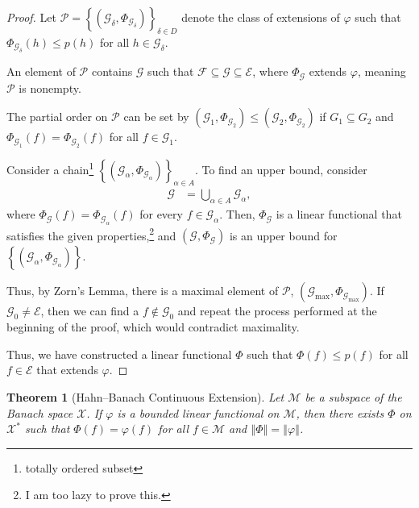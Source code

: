 \documentclass[12pt]{extarticle}
\newcommand{\norm}[1]{\left\Vert #1\right\Vert}
\newcommand{\set}[1]{\left\{#1\right\}}
\theoremstyle{plain}
\newtheorem*{theorem}{Theorem}
\theoremstyle{definition}
\theoremstyle{note}
\renewcommand{\newline}{\hfill\break}
\begin{document}
\begin{proof}
  Let $\mathcal{P} = \set{(\mathcal{G}_{\delta},\Phi_{\mathcal{G}_{\delta}})}_{\delta \in D}$ denote the class of extensions of $\varphi$ such that $\Phi_{\mathcal{G}_{\delta}}(h) \leq p(h)$ for all $h\in \mathcal{G}_{\delta}$.\newline

  An element of $\mathcal{P}$ contains $\mathcal{G}$ such that $\mathcal{F}\subseteq \mathcal{G}\subseteq \mathcal{E}$, where $\Phi_{\mathcal{G}}$ extends $\varphi$, meaning $\mathcal{P}$ is nonempty.\newline

  The partial order on $\mathcal{P}$ can be set by $\left(\mathcal{G}_{1},\Phi_{\mathcal{G}_2}\right)\leq \left(\mathcal{G}_{2},\Phi_{\mathcal{G}_{2}}\right)$ if $G_1\subseteq G_2$ and $\Phi_{\mathcal{G}_1}(f) = \Phi_{\mathcal{G}_{2}}(f)$ for all $f\in \mathcal{G}_{1}$.\newline

  Consider a chain\footnote{totally ordered subset} $\set{\left(\mathcal{G}_{\alpha},\Phi_{\mathcal{G}_{\alpha}}\right)}_{\alpha \in A}$. To find an upper bound, consider
  \begin{align*}
    \mathcal{G} &= \bigcup_{\alpha \in A}\mathcal{G}_{\alpha},
  \end{align*}
  where $\Phi_{\mathcal{G}}(f) = \Phi_{\mathcal{G}_{\alpha}}(f)$ for every $f\in \mathcal{G}_{\alpha}$. Then, $\Phi_{\mathcal{G}}$ is a linear functional that satisfies the given properties,\footnote{I am too lazy to prove this.} and $\left(\mathcal{G},\Phi_{\mathcal{G}}\right)$ is an upper bound for $\set{\left(\mathcal{G}_{\alpha},\Phi_{\mathcal{G}_{\alpha}}\right)}$.\newline

  Thus, by Zorn's Lemma, there is a maximal element of $\mathcal{P}$, $\left(\mathcal{G}_{\text{max}},\Phi_{\mathcal{G}_{\text{max}}}\right)$. If $\mathcal{G}_0\neq \mathcal{E}$, then we can find a $f\notin \mathcal{G}_{0}$ and repeat the process performed at the beginning of the proof, which would contradict maximality.\newline

  Thus, we have constructed a linear functional $\Phi$ such that $\Phi(f) \leq p(f)$ for all $f\in \mathcal{E}$ that extends $\varphi$.
\end{proof}
\begin{theorem}[Hahn--Banach Continuous Extension]
  Let $\mathcal{M}$ be a subspace of the Banach space $\mathcal{X}$. If $\varphi$ is a bounded linear functional on $\mathcal{M}$, then there exists $\Phi$ on $\mathcal{X}^{\ast}$ such that $\Phi(f) = \varphi(f)$ for all $f\in \mathcal{M}$ and $\norm{\Phi} = \norm{\varphi}$.
\end{theorem}
\end{document}
